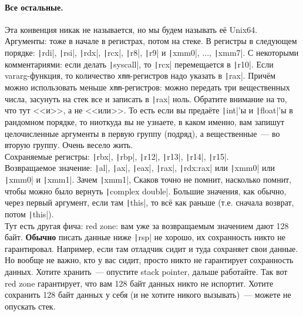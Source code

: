 \documentclass{article}
\begin{document}
    \paragraph{Все остальные.}
    Эта конвенция никак не называется, но мы будем называть её Unix64.\\
    Аргументы: тоже в начале в регистрах, потом на стеке. В регистры в следующем порядке: \texttt|rdi|, \texttt|rsi|, \texttt|rdx|, \texttt|rcx|, \texttt|r8|, \texttt|r9| и \texttt|xmm0|, ..., \texttt|xmm7|. С некоторыми комментариями: если делать \texttt|syscall|, то \texttt|rcx| перемещается в \texttt|r10|. Если vararg-функция, то количество \Verb|xmm|-регистров надо указать в \texttt|rax|. Причём можно использовать меньше \Verb|xmm|-регистров: можно передать три вещественных числа, засунуть на стек все и записать в \texttt|rax| ноль. Обратите внимание на то, что тут <<и>>, а не <<или>>. То есть если вы предаёте \texttt|int|'ы и \texttt|float|'ы в рандомном порядке, то ниоткуда вы не узнаете, в каком именно, вам запишут целочисленные аргументы в первую группу (подряд), а вещественные~--- во вторую группу. Очень весело жить.\\
    Сохраняемые регистры: \texttt|rbx|, \texttt|rbp|, \texttt|r12|, \texttt|r13|, \texttt|r14|, \texttt|r15|.\\
    Возвращаемое значение: \texttt|al|, \texttt|ax|, \texttt|eax|, \texttt|rax|, \texttt|rdx:rax| или \texttt|xmm0| или \texttt|xmm0| и \texttt|xmm1|. Зачем \texttt|xmm1|, Скаков точно не помнит, насколько помнит, чтобы можно было вернуть \texttt|complex double|. Большие значения, как обычно, через первый аргумент, если там \texttt|this|, то всё как раньше (т.е. сначала возврат, потом \texttt|this|).\\
    Тут есть другая фича: red zone: вам уже за возвращаемым значением дают 128 байт. \textbf{Обычно} писать данные ниже \texttt|rsp| не хорошо, их сохранность никто не гарантировал. Например, если там отладчик сидит и туда сохраняет свои данные. Но вообще не важно, кто у вас сидит, просто никто не гарантирует сохранность данных. Хотите хранить~--- опустите stack pointer, дальше работайте. Так вот red zone гарантирует, что вам 128 байт данных никто не испортит. Хотите сохранить 128 байт данных у себя (и не хотите никого вызывать)~--- можете не опускать стек.
\end{document}
